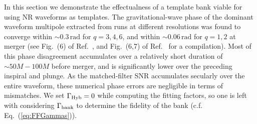 In this section we demonstrate the effectualness of a template bank viable
for using NR waveforms as templates. The gravitational-wave phase of the dominant 
waveform multipole 
extracted from runs at different resolutions was found to converge within 
$\sim 0.3\,\mathrm{rad}$ for $q=3,4,6$, and within $\sim 0.06\,\mathrm{rad}$
for $q=1,2$ at merger (see Fig.~(6) of Ref.~\cite{Buchman:2012dw}, and 
Fig.~(6,7) of Ref.~\cite{BuonannoEOBv2Main} for a compilation). Most of this 
phase disagreement accumulates over a relatively short duration of 
$\sim 50M  - 100M$ before merger, and is significantly lower over the preceding
inspiral and plunge. As the matched-filter SNR accumulates secularly over the
entire waveform, 
these numerical phase errors are negligible in terms of mismatches. We set
$\Gamma_{\mathrm{Hyb}} = 0$ while computing the fitting factors, so one is left with
considering $\Gamma_{\mathrm{bank}}$ to determine the fidelity of the bank (c.f.
Eq.~(\ref{eq:FFGammas})).

